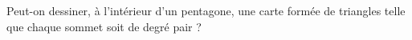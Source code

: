 Peut-on dessiner, à l'intérieur d'un pentagone, une carte formée de triangles telle que chaque sommet soit de degré pair ?

